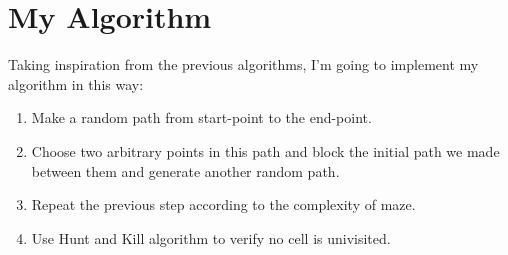 \documentclass{article}
\begin{document}
\section*{My Algorithm}
Taking inspiration from the previous algorithms, I'm going to implement my algorithm in this way:

\begin{enumerate}
    \item Make a random path from start-point to the end-point.
    \item Choose two arbitrary points in this path and block the initial path we made between them and generate another random path.
    \item Repeat the previous step according to the complexity of maze.
    \item Use Hunt and Kill algorithm to verify no cell is univisited.
\end{enumerate}

\printbibliography
\end{document}
